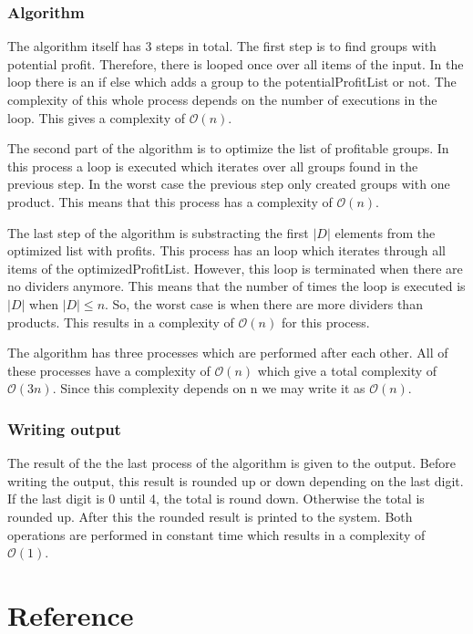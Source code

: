 \documentclass{article}
\newcommand{\bigO}[1]{\mathcal{O}(#1)}
\begin{document}
\subsubsection{Algorithm}
The algorithm itself has 3 steps in total. The first step is to find groups with potential profit. Therefore, there is looped once over all items of the input. In the loop there is an if else which adds a group to the potentialProfitList or not. The complexity of this whole process depends on the number of executions in the loop. This gives a complexity of $\bigO{n}$.

The second part of the algorithm is to optimize the list of profitable groups. In this process a loop is executed which iterates over all groups found in the previous step. In the worst case the previous step only created groups with one product. This means that this process has a complexity of $\bigO{n}$.

The last step of the algorithm is substracting the first $|D|$ elements from the optimized list with profits. This process has an loop which iterates through all items of the optimizedProfitList. However, this loop is terminated when there are no dividers anymore. This means that the number of times the loop is executed is $|D|$ when $|D| \leq n$. So, the worst case is when there are more dividers than products. This results in a complexity of $\bigO{n}$ for this process.

The algorithm has three processes which are performed after each other. All of these processes have a complexity of $\bigO{n}$ which give a total complexity of $\bigO{3n}$. Since this complexity depends on n we may write it as $\bigO{n}$.

\subsubsection{Writing output}
The result of the the last process of the algorithm is given to the output. Before writing the output, this result is rounded up or down depending on the last digit. If the last digit is 0 until 4, the total is round down. Otherwise the total is rounded up. After this the rounded result is printed to the system. Both operations are performed in constant time which results in a complexity of $\bigO{1}$.

\newpage
\section{Reference}
\end{document}
